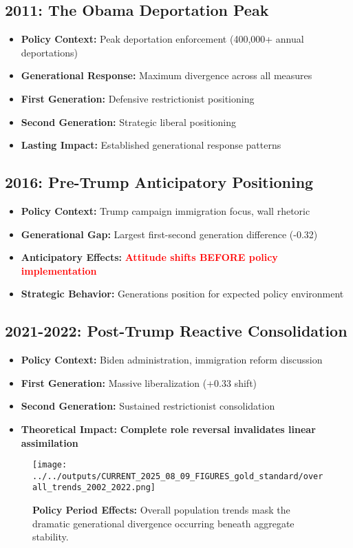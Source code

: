 \documentclass[11pt,letterpaper]{article}
\newcommand{\compactdesc}[2]{\item \textbf{#1:} #2}
\newcommand{\keyfinding}[1]{\colorbox{yellow!20}{\textbf{#1}}}
\newcommand{\surprise}[1]{\textcolor{red}{\textbf{#1}}}
\begin{document}
\subsection{2011: The Obama Deportation Peak}
\begin{itemize}
    \compactdesc{Policy Context}{Peak deportation enforcement (400,000+ annual deportations)}
    \compactdesc{Generational Response}{Maximum divergence across all measures}
    \compactdesc{First Generation}{Defensive restrictionist positioning}
    \compactdesc{Second Generation}{Strategic liberal positioning}
    \compactdesc{Lasting Impact}{Established generational response patterns}
\end{itemize}

\subsection{2016: Pre-Trump Anticipatory Positioning}
\begin{itemize}
    \compactdesc{Policy Context}{Trump campaign immigration focus, wall rhetoric}
    \compactdesc{Generational Gap}{Largest first-second generation difference (-0.32)}
    \compactdesc{Anticipatory Effects}{\surprise{Attitude shifts BEFORE policy implementation}}
    \compactdesc{Strategic Behavior}{Generations position for expected policy environment}
\end{itemize}

\subsection{2021-2022: Post-Trump Reactive Consolidation}
\begin{itemize}
    \compactdesc{Policy Context}{Biden administration, immigration reform discussion}
    \compactdesc{First Generation}{Massive liberalization (+0.33 shift)}
    \compactdesc{Second Generation}{Sustained restrictionist consolidation}
    \compactdesc{Theoretical Impact}{\keyfinding{Complete role reversal invalidates linear assimilation}}
\end{itemize}

\begin{figure}[H]
    \centering
    \texttt{[image: ../../outputs/CURRENT\_2025\_08\_09\_FIGURES\_gold\_standard/overall\_trends\_2002\_2022.png]}
    \caption{\textbf{Policy Period Effects:} Overall population trends mask the dramatic generational divergence occurring beneath aggregate stability.}
    \label{fig:overall_trends}
\end{figure}
\end{document}
